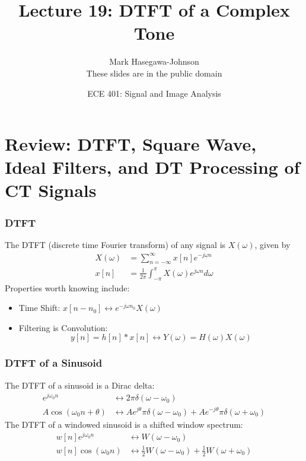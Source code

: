 \documentclass{beamer}
\title{Lecture 19: DTFT of a Complex Tone}
\author{Mark Hasegawa-Johnson\\These slides are in the public domain}
\date{ECE 401: Signal and Image Analysis}
\begin{document}
\begin{frame}
  \maketitle
\end{frame}

\begin{frame}
  \tableofcontents
\end{frame}

\section[Review]{Review: DTFT, Square Wave, Ideal Filters, and DT Processing of CT Signals}
\setcounter{subsection}{1}

\begin{frame}
  \frametitle{DTFT}

  The DTFT (discrete time Fourier transform) of any signal is
  $X(\omega)$, given by
  \begin{align*}
    X(\omega) &= \sum_{n=-\infty}^\infty x[n]e^{-j\omega n}\\
    x[n] &= \frac{1}{2\pi}\int_{-\pi}^\pi X(\omega)e^{j\omega n}d\omega
  \end{align*}
  Properties worth knowing  include:
  \begin{itemize}
  \item Time Shift: $x[n-n_0]\leftrightarrow e^{-j\omega n_0}X(\omega)$
  \item Filtering is Convolution:
    \[
    y[n]=h[n]\ast x[n]\leftrightarrow Y(\omega)=H(\omega)X(\omega)
    \]
  \end{itemize}
\end{frame}

\begin{frame}
  \frametitle{DTFT of a Sinusoid}

  The DTFT of a sinusoid is a Dirac delta:
  \begin{align*}
    e^{j\omega_0 n} &\leftrightarrow 2\pi \delta(\omega-\omega_0)\\
    A\cos(\omega_0 n+\theta) &
    \leftrightarrow Ae^{j\theta}\pi \delta(\omega-\omega_0)+Ae^{-j\theta}\pi \delta(\omega+\omega_0)
  \end{align*}
  The DTFT of a windowed sinusoid is a shifted window spectrum:
  \begin{align*}
    w[n]e^{j\omega_0 n} &\leftrightarrow W(\omega-\omega_0)\\
    w[n]\cos(\omega_0 n) &
    \leftrightarrow \frac{1}{2}W(\omega-\omega_0)+\frac{1}{2}W(\omega+\omega_0)
  \end{align*}
\end{frame}
\end{document}
